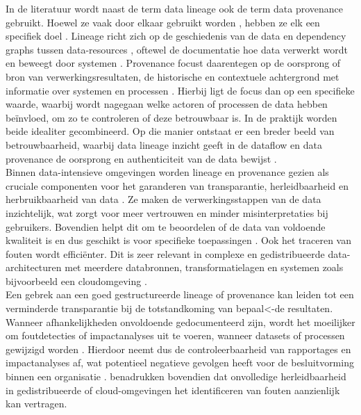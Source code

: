 In de literatuur wordt naast de term data lineage ook de term data provenance gebruikt. Hoewel ze vaak door elkaar gebruikt worden \autocite{mayernik2013data}, hebben ze elk een specifiek doel \autocite{infobelpro2025}. Lineage richt zich op de geschiedenis van de data en dependency graphs tussen data-resources \autocite{mayernik2013data}, oftewel de documentatie hoe data verwerkt wordt en beweegt door systemen \autocite{patel2020data}. Provenance focust daarentegen op de oorsprong of bron van verwerkingsresultaten, de historische en contextuele achtergrond met informatie over systemen en processen \autocite{mayernik2013data,patel2020data}. Hierbij ligt de focus dan op een specifieke waarde, waarbij wordt nagegaan welke actoren of processen de data hebben beïnvloed, om zo te controleren of deze betrouwbaar is. In de praktijk worden beide idealiter gecombineerd. Op die manier ontstaat er een breder beeld van betrouwbaarheid, waarbij data lineage inzicht geeft in de dataflow en data provenance de oorsprong en authenticiteit van de data bewijst \autocite{infobelpro2025}.\\

Binnen data-intensieve omgevingen worden lineage en provenance gezien als cruciale componenten voor het garanderen van transparantie, herleidbaarheid en herbruikbaarheid van data \autocite{mayernik2013data}. Ze maken de verwerkingsstappen van de data inzichtelijk, wat zorgt voor meer vertrouwen en minder misinterpretaties bij gebruikers. Bovendien helpt dit om te beoordelen of de data van voldoende kwaliteit is en dus geschikt is voor specifieke toepassingen \autocite{mayernik2013data}. Ook het traceren van fouten wordt efficiënter. Dit is zeer relevant in complexe en gedistribueerde data-architecturen met meerdere databronnen, transformatielagen en systemen zoals bijvoorbeeld een cloudomgeving \autocite{patel2020data}.\\

Een gebrek aan een goed gestructureerde lineage of provenance kan leiden tot een verminderde transparantie bij de totstand\-koming van be\-paal<-de re\-sultaten. Wanneer afhankelijkheden onvoldoende gedocumenteerd zijn, wordt het moeilijker om foutdetecties of impactanalyses uit te voeren, wanneer datasets of processen gewijzigd worden \autocite{patel2020data}. Hierdoor neemt dus de controleerbaarheid van rapportages en impactanalyses af, wat potentieel negatieve gevolgen heeft voor de besluitvorming binnen een organisatie \autocite{verma2024tracing}. \textcite{patel2020data} benadrukken bovendien dat onvolledige herleidbaarheid in gedistribueerde of cloud-omgevingen het identificeren van fouten aanzienlijk kan vertragen.\\

